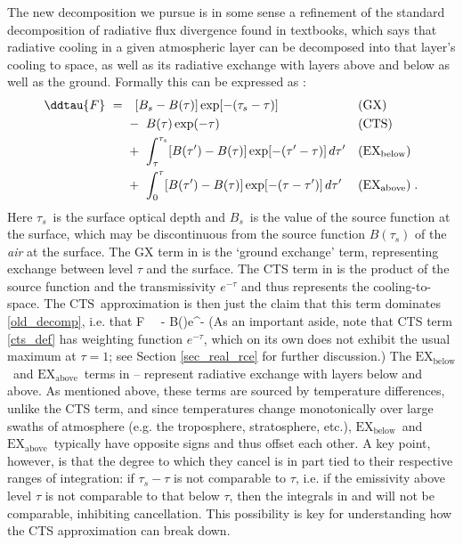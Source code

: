 \documentclass[10pt]{article}
\newcommand{\taus}{\ensuremath{\tau_s}}
\newcommand{\Bs}{\ensuremath{B_s}}
\newcommand{\CTS}{\ensuremath{\mathrm{CTS}}}
\newcommand{\EXbelow}{\ensuremath{\mathrm{EX_{below}}}}
\newcommand{\EXabove}{\ensuremath{\mathrm{EX_{above}}}}
\begin{document}
The new decomposition we pursue is in some sense a refinement of the standard decomposition of radiative flux divergence  found in textbooks, which says that radiative cooling in a given atmospheric layer can be decomposed into that layer's cooling to space, as well as its radiative exchange with layers above and below as well as the ground. Formally this can be expressed as \citep[e.g.][]{petty2006,thomas2002}:
	\begin{subequations}
	\begin{align}
			\ddtau{F} \ =\  & \ \   [\Bs-B(\tau)]\exp[-(\taus-\tau)] 
											&& \text{(GX)}  \label{gx_def} \\
								& -\  B(\tau)\exp(-\tau)
											& & \text{(CTS)} \label{cts_def} \\
								& +\ \int_\tau^{\taus} [B(\tau')-B(\tau)]\exp[-(\tau'-\tau)] \, d\tau' 
											& &(\EXbelow)  \label{exch_below}  \\
								& +\  \int_0^{\tau} [B(\tau')-B(\tau)]\exp[-(\tau-\tau')] \, d\tau'  
											& &(\EXabove) \; .  \label{exch_above} 
		\end{align}
		\label{old_decomp}
	\end{subequations}
Here \taus\ is the surface optical depth and \Bs\ is the value of the source function at the surface, which may be discontinuous from the source function $B(\taus)$ of the \emph{air} at the surface. The GX term in   is  the `ground exchange' term,  representing exchange between level $\tau$ and the surface. The CTS term in  is  the product of the source function and the transmissivity $e^{-\tau}$ and thus represents the cooling-to-space. The \CTS\ approximation is then just the claim that this term dominates \eqref{old_decomp},  i.e. that
\beqn
	\pptau F \ \approx \  - B(\tau)e^{-\tau}  \quad \quad   {} 
	\label{cts_approx}
\eeqn
(As an important aside, note that CTS term  \eqref{cts_def} has weighting function $e^{-\tau}$, which on its own does not exhibit the usual maximum at $\tau=1$; see Section \ref{sec_real_rce} for further discussion.) The \EXbelow\ and \EXabove\  terms in -- represent radiative exchange  with layers below and above. As mentioned above, these terms are sourced by temperature differences, unlike the CTS term, and since temperatures change monotonically over large swaths of atmosphere (e.g. the troposphere, stratosphere, etc.), \EXbelow\ and \EXabove\ typically have opposite signs and thus offset each other. A key point, however, is that the degree to which they cancel is in part tied to their respective ranges of integration: if $\taus-\tau$ is not comparable to $\tau$, i.e. if the emissivity above level $\tau$ is not comparable to that below $\tau$, then the integrals in  and  will not be comparable, inhibiting cancellation. This possibility is key for understanding how the CTS approximation can break down. 
\end{document}
